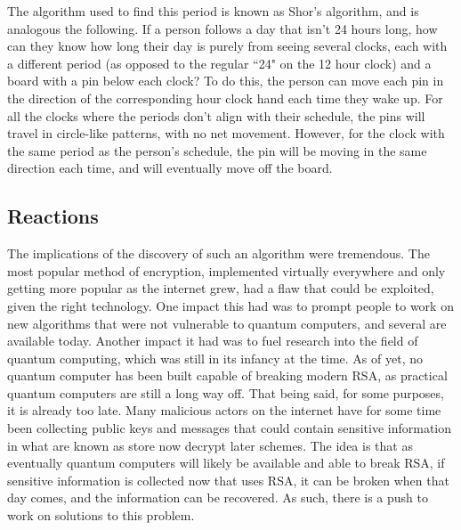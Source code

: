 \documentclass[a4paper,12pt]{report}
\begin{document}
The algorithm used to find this period is known as Shor's algorithm, and is
analogous the following\cite{aaronson}. If a person follows a day that isn't 24
hours long, how can they know how long their day is purely from seeing several
clocks, each with a different period (as opposed to the regular ``24" on the 12
hour clock) and a board with a pin below each clock? To do this, the person can
move each pin in the direction of the corresponding hour clock hand each time
they wake up. For all the clocks where the periods don't align with their
schedule, the pins will travel in circle-like patterns, with no net movement.
However, for the clock with the same period as the person's schedule, the pin
will be moving in the same direction each time, and will eventually move off the
board.

    \subsection{Reactions}
The implications of the discovery of such an algorithm were tremendous. The most
popular method of encryption, implemented virtually everywhere and only getting
more popular as the internet grew, had a flaw that could be exploited, given the
right technology. One impact this had was to prompt people to work on new
algorithms that were not vulnerable to quantum computers, and several are
available today. Another impact it had was to fuel research into the field of
quantum computing, which was still in its infancy at the time. As of yet, no
quantum computer has been built capable of breaking modern RSA, as practical
quantum computers are still a long way off. That being said, for some purposes,
it is already too late. Many malicious actors on the internet have for some time
been collecting public keys and messages that could contain sensitive
information in what are known as store now decrypt later schemes. The idea is
that as eventually quantum computers will likely be available and able to break
RSA, if sensitive information is collected now that uses RSA, it can be broken
when that day comes, and the information can be recovered. As such, there is a
push to work on solutions to this problem.
\end{document}
